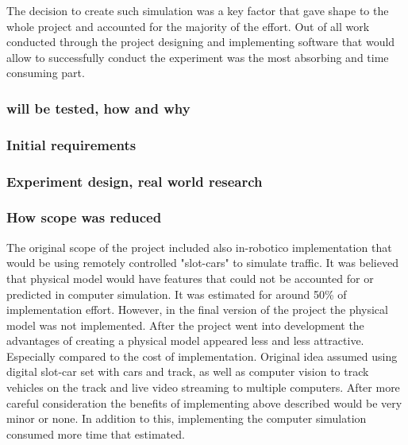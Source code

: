 \documentclass[11pt,english]{article}
\begin{document}
The decision to create such simulation was a key factor that gave shape to the whole project and accounted for the majority of the effort. Out of all work conducted through the project designing and implementing software that would allow to successfully conduct the experiment was the most absorbing and time consuming part.






\subsubsection{will be tested, how and why}

\subsubsection{Initial requirements}

\subsubsection{Experiment design, real world research}



\subsubsection{How scope was reduced}

The original scope of the project included also in-robotico implementation that would be using remotely controlled "slot-cars" to simulate traffic. It was believed that physical model would have features that could not be accounted for or predicted in computer simulation. It was estimated for around 50\% of implementation effort. However, in the final version of the project the physical model was not implemented. After the project went into development the advantages of creating a physical model appeared less and less attractive. Especially compared to the cost of implementation. Original idea assumed using digital slot-car set with cars and track, as well as computer vision to track vehicles on the track and live video streaming to multiple computers. After more careful consideration the benefits of implementing above described would be very minor or none. In addition to this, implementing the computer simulation consumed more time that estimated. 
\end{document}
